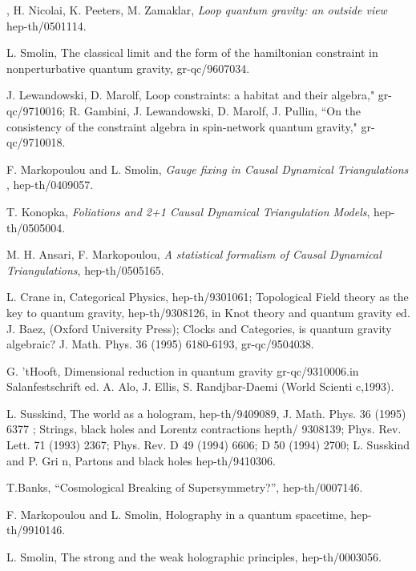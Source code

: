 \documentclass[12pt]{article}
\begin{document}
\begin{thebibliography}{0}
{{{, H. Nicolai, K.  Peeters, M.  Zamaklar,
{\it    Loop quantum gravity: an outside view }
hep-th/0501114. 

L. Smolin, The classical limit and the form of
the hamiltonian constraint in nonperturbative
quantum gravity, gr-qc/9607034.

J. Lewandowski, D. Marolf, Loop constraints: a habitat
and their algebra,"
gr-qc/9710016;  R. Gambini, J. Lewandowski, D. Marolf, J. Pullin, ``On the
consistency of
the constraint algebra in spin-network quantum gravity," gr-qc/9710018.

F. Markopoulou and L. Smolin, 
{\it  Gauge fixing in Causal Dynamical Triangulations   },
hep-th/0409057.  

T. Konopka, {\it 
 Foliations and 2+1 Causal Dynamical Triangulation Models}, 
hep-th/0505004.   

 M. H. Ansari, F.  Markopoulou,
{\it  A statistical formalism of Causal Dynamical Triangulations},
hep-th/0505165.


L. Crane in, Categorical Physics, hep-th/9301061;
Topological Field theory as the key
to quantum gravity, hep-th/9308126, in Knot theory and quantum gravity
ed. J. Baez,
(Oxford University Press); Clocks and Categories, is quantum gravity
algebraic? J.
Math. Phys. 36 (1995) 6180-6193, gr-qc/9504038.

G. 'tHooft, Dimensional reduction in quantum
gravity gr-qc/9310006.in
Salanfestschrift ed. A. Alo, J. Ellis, S. Randjbar-Daemi (World Scienti
 c,1993).

L. Susskind, The world as a hologram, hep-th/9409089,
J. Math. Phys.
36 (1995) 6377 ; Strings, black holes and Lorentz contractions hepth/
9308139; Phys. Rev. Lett. 71 (1993) 2367; Phys. Rev. D 49 (1994)
6606; D 50 (1994) 2700; L. Susskind and P. Gri
 n, Partons and black
holes hep-th/9410306.

T.Banks, ``Cosmological Breaking of Supersymmetry?'',
hep-th/0007146.

F. Markopoulou and L. Smolin, Holography in a
quantum spacetime, hep-th/9910146.

L. Smolin, The strong
and the weak holographic principles, hep-th/0003056.
}}}
\end{thebibliography}
\end{document}
